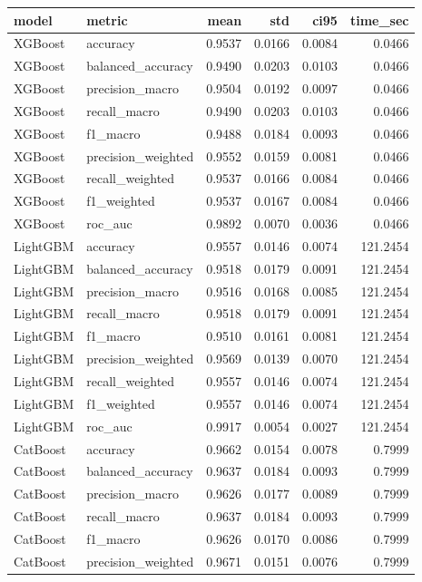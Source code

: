 \begin{tabular}{llrrrr}
\toprule
model & metric & mean & std & ci95 & time_sec \\
\midrule
XGBoost & accuracy & 0.9537 & 0.0166 & 0.0084 & 0.0466 \\
XGBoost & balanced_accuracy & 0.9490 & 0.0203 & 0.0103 & 0.0466 \\
XGBoost & precision_macro & 0.9504 & 0.0192 & 0.0097 & 0.0466 \\
XGBoost & recall_macro & 0.9490 & 0.0203 & 0.0103 & 0.0466 \\
XGBoost & f1_macro & 0.9488 & 0.0184 & 0.0093 & 0.0466 \\
XGBoost & precision_weighted & 0.9552 & 0.0159 & 0.0081 & 0.0466 \\
XGBoost & recall_weighted & 0.9537 & 0.0166 & 0.0084 & 0.0466 \\
XGBoost & f1_weighted & 0.9537 & 0.0167 & 0.0084 & 0.0466 \\
XGBoost & roc_auc & 0.9892 & 0.0070 & 0.0036 & 0.0466 \\
LightGBM & accuracy & 0.9557 & 0.0146 & 0.0074 & 121.2454 \\
LightGBM & balanced_accuracy & 0.9518 & 0.0179 & 0.0091 & 121.2454 \\
LightGBM & precision_macro & 0.9516 & 0.0168 & 0.0085 & 121.2454 \\
LightGBM & recall_macro & 0.9518 & 0.0179 & 0.0091 & 121.2454 \\
LightGBM & f1_macro & 0.9510 & 0.0161 & 0.0081 & 121.2454 \\
LightGBM & precision_weighted & 0.9569 & 0.0139 & 0.0070 & 121.2454 \\
LightGBM & recall_weighted & 0.9557 & 0.0146 & 0.0074 & 121.2454 \\
LightGBM & f1_weighted & 0.9557 & 0.0146 & 0.0074 & 121.2454 \\
LightGBM & roc_auc & 0.9917 & 0.0054 & 0.0027 & 121.2454 \\
CatBoost & accuracy & 0.9662 & 0.0154 & 0.0078 & 0.7999 \\
CatBoost & balanced_accuracy & 0.9637 & 0.0184 & 0.0093 & 0.7999 \\
CatBoost & precision_macro & 0.9626 & 0.0177 & 0.0089 & 0.7999 \\
CatBoost & recall_macro & 0.9637 & 0.0184 & 0.0093 & 0.7999 \\
CatBoost & f1_macro & 0.9626 & 0.0170 & 0.0086 & 0.7999 \\
CatBoost & precision_weighted & 0.9671 & 0.0151 & 0.0076 & 0.7999 \\

\end{tabular}
